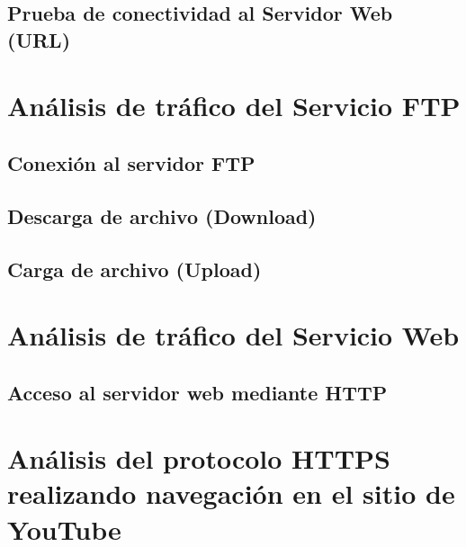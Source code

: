 \documentclass[10pt]{article}
\begin{document}
\subsection{Prueba de conectividad al Servidor Web (URL)}


\renewcommand{\thesection}{8.\arabic{section}}
\setcounter{section}{0}
\section{Análisis de tráfico del Servicio FTP}
\subsection{Conexión al servidor FTP}
\subsection{Descarga de archivo (Download)}
\subsection{Carga de archivo (Upload)}

\renewcommand{\thesection}{8.\arabic{section}}
\setcounter{section}{0}
\section{Análisis de tráfico del Servicio Web}
\subsection{Acceso al servidor web mediante HTTP}

\renewcommand{\thesection}{8.\arabic{section}}
\setcounter{section}{0}
\section{Análisis del protocolo HTTPS realizando navegación en el sitio de YouTube}
\end{document}
